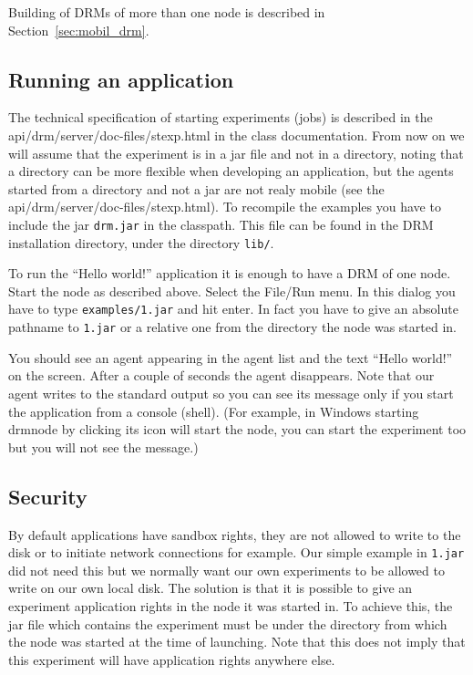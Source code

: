 \documentclass{article}
\begin{document}
Building of DRMs of more than one node is described in
Section~\ref{sec:mobil_drm}.

\subsection{Running an application}

The technical specification of starting experiments (jobs)
is described in the  
{api/drm/server/doc-files/stexp.html} in the class documentation.
From now on we will assume that the experiment is in a jar file and not in
a directory, noting that
a directory can be more flexible when developing an application,
but the agents started from a directory and not a jar are not realy mobile
(see the 
{api/drm/server/doc-files/stexp.html}).
To recompile the examples you have to include the jar {\tt drm.jar} in the
classpath.
This file can be found in the DRM installation directory, under
the directory {\tt lib/}.

To run the ``Hello world!'' application it is enough to have a DRM
of one node.
Start the node as described above.
Select the File/Run menu.
In this dialog you have to type {\tt examples/1.jar} and hit enter.
In fact you have to give an absolute pathname to {\tt 1.jar} or a relative one
from the directory the node was started in.

You should see an agent appearing in the agent list and
the text ``Hello world!'' on the screen.
After a couple of seconds the agent disappears.
Note that our agent writes to the standard output so you can see its
message only if you start the application from a console (shell).
(For example, in Windows starting drmnode by clicking its icon
will start the node,
you can start the experiment too but you will not see the message.)

\subsection{Security}

By default applications have sandbox rights, they are not allowed to write
to the disk or to initiate network connections for example.
Our simple example in {\tt 1.jar} did not need this but
we normally want our own experiments to
be allowed to write on our own local disk.
The solution is that 
it is possible to give an experiment application rights in the node
it was started in.
To achieve this, the jar file which contains the experiment must be
under the directory from which the node was started at the time of launching.
Note that this does not imply that this experiment will have application
rights anywhere else.
\end{document}
